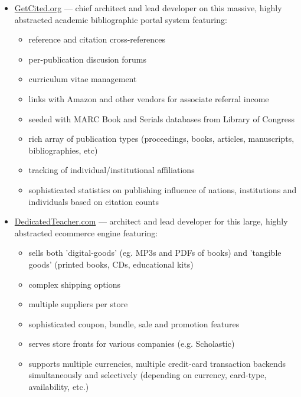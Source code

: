 \documentclass[line,margin]{res}
\begin{document}
\begin{resume}
\begin{position}
\begin{itemize}
\item \href{https://web.archive.org/web/20140517102110/http://getcited.org/}{GetCited.org}
  --- chief architect and lead developer on this massive, highly abstracted
      academic bibliographic portal system featuring:
  \begin{itemize}
    \item reference and citation cross-references
    \item per-publication discusion forums
    \item curriculum vitae management
    \item links with Amazon and other vendors for associate
    referral income
    \item seeded with MARC Book and Serials databases from Library of Congress
    \item rich array of publication types (proceedings, books, articles,
       manuscripts, bibliographies, etc)
    \item tracking of individual/institutional affiliations
    \item sophisticated statistics on publishing influence of
       nations, institutions and individuals based on citation counts
  \end{itemize}

\item \href{http://www.dedicatedteacher.com/}{DedicatedTeacher.com}
   --- architect and lead developer
  for this large, highly abstracted ecommerce engine featuring:
    \begin{itemize}
      \item sells both 'digital-goods' (eg. MP3s and PDFs of books)
      and 'tangible goods' (printed books, CDs, educational kits)
      \item complex shipping options
      \item multiple suppliers per store
      \item sophisticated coupon, bundle, sale and promotion features
      \item serves store fronts for various companies
      (e.g. Scholastic)
      \item supports multiple currencies, multiple credit-card
      transaction backends simultaneously and selectively
      (depending on currency, card-type, availability, etc.)
    \end{itemize}


\end{itemize}
\end{position}
\end{resume}
\end{document}
